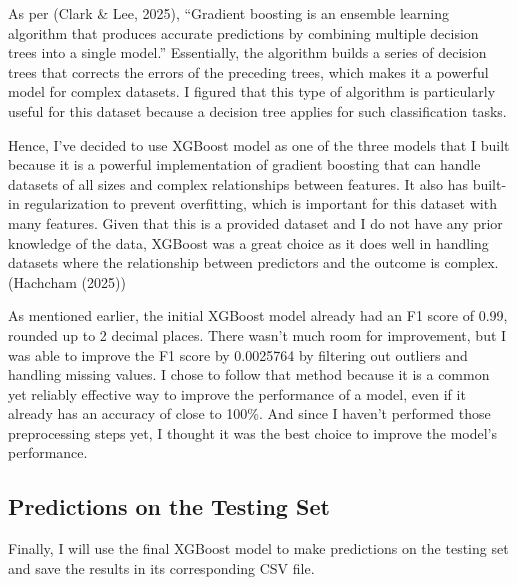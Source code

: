 \documentclass[
]{article}
\begin{document}
As per (Clark \& Lee, 2025), ``Gradient boosting is an ensemble learning
algorithm that produces accurate predictions by combining multiple
decision trees into a single model.'' Essentially, the algorithm builds
a series of decision trees that corrects the errors of the preceding
trees, which makes it a powerful model for complex datasets. I figured
that this type of algorithm is particularly useful for this dataset
because a decision tree applies for such classification tasks.

Hence, I've decided to use XGBoost model as one of the three models that
I built because it is a powerful implementation of gradient boosting
that can handle datasets of all sizes and complex relationships between
features. It also has built-in regularization to prevent overfitting,
which is important for this dataset with many features. Given that this
is a provided dataset and I do not have any prior knowledge of the data,
XGBoost was a great choice as it does well in handling datasets where
the relationship between predictors and the outcome is complex.
(Hachcham (2025))

As mentioned earlier, the initial XGBoost model already had an F1 score
of 0.99, rounded up to 2 decimal places. There wasn't much room for
improvement, but I was able to improve the F1 score by 0.0025764 by
filtering out outliers and handling missing values. I chose to follow
that method because it is a common yet reliably effective way to improve
the performance of a model, even if it already has an accuracy of close
to 100\%. And since I haven't performed those preprocessing steps yet, I
thought it was the best choice to improve the model's performance.

\subsection{Predictions on the Testing
Set}\label{predictions-on-the-testing-set}

Finally, I will use the final XGBoost model to make predictions on the
testing set and save the results in its corresponding CSV file.
\end{document}
